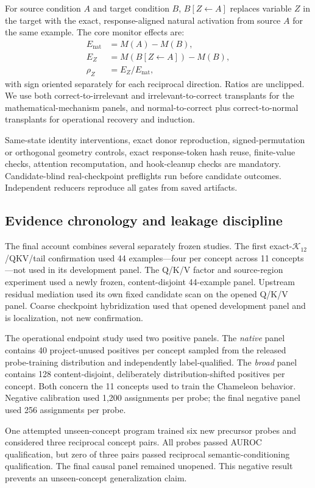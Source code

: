 \documentclass[10pt,twocolumn]{article}
\newcommand{\K}{\ensuremath{\mathcal{K}_{12}}}
\begin{document}
For source condition $A$ and target condition $B$, $B[Z\leftarrow A]$ replaces variable $Z$ in the target with the exact, response-aligned natural activation from source $A$ for the same example. The core monitor effects are:
\begin{align}
E_{\mathrm{nat}} &= M(A)-M(B),\\
E_Z &= M(B[Z\leftarrow A])-M(B),\\
\rho_Z &= E_Z/E_{\mathrm{nat}},
\end{align}
with sign oriented separately for each reciprocal direction. Ratios are unclipped. We use both correct-to-irrelevant and irrelevant-to-correct transplants for the mathematical-mechanism panels, and normal-to-correct plus correct-to-normal transplants for operational recovery and induction.

Same-state identity interventions, exact donor reproduction, signed-permutation or orthogonal geometry controls, exact response-token hash reuse, finite-value checks, attention recomputation, and hook-cleanup checks are mandatory. Candidate-blind real-checkpoint preflights run before candidate outcomes. Independent reducers reproduce all gates from saved artifacts.

\subsection{Evidence chronology and leakage discipline}

The final account combines several separately frozen studies. The first exact-\K/QKV/tail confirmation used 44 examples---four per concept across 11 concepts---not used in its development panel. The Q/K/V factor and source-region experiment used a newly frozen, content-disjoint 44-example panel. Upstream residual mediation used its own fixed candidate scan on the opened Q/K/V panel. Coarse checkpoint hybridization used that opened development panel and is localization, not new confirmation.

The operational endpoint study used two positive panels. The \emph{native} panel contains 40 project-unused positives per concept sampled from the released probe-training distribution and independently label-qualified. The \emph{broad} panel contains 128 content-disjoint, deliberately distribution-shifted positives per concept. Both concern the 11 concepts used to train the Chameleon behavior. Negative calibration used 1,200 assignments per probe; the final negative panel used 256 assignments per probe.

One attempted unseen-concept program trained six new precursor probes and considered three reciprocal concept pairs. All probes passed AUROC qualification, but zero of three pairs passed reciprocal semantic-conditioning qualification. The final causal panel remained unopened. This negative result prevents an unseen-concept generalization claim.
\end{document}

